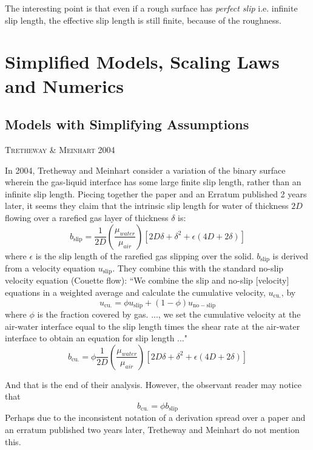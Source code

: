 \documentclass[12pt, a4paper, twoside, openright]{book}
\newcommand{\paper}[1]
         {\colorbox[gray]{0.8}{ \textsc{#1}}
         
         }
\begin{document}
The interesting point is that even if a rough surface has \emph{perfect slip} i.e. infinite slip length, the effective slip length is still finite, because of the roughness.


\section*{Simplified Models, Scaling Laws and Numerics}

\subsection*{Models with Simplifying Assumptions}

\paper{Tretheway \& Meinhart 2004}
In 2004, Tretheway and Meinhart \cite{TrethewayMeinhart2004} consider a variation of the binary surface wherein the gas-liquid interface has some large finite slip length, rather than an infinite slip length.  Piecing together the paper and an Erratum \cite{TrethewayMeinhartErratum2004} published 2 years later, it seems they claim that the intrinsic slip length for water of thickness $2D$ flowing over a rarefied gas layer of thickness $\delta$ is:
\begin{equation}
b_{\mathrm{slip}} = \frac{1}{2D} \left( \frac{\mu_{water}}{\mu_{air}} \right)
\left[ 2D\delta + \delta^2 + \epsilon(4D + 2\delta) \right]
\end{equation}
where $\epsilon$ is the slip length of the rarefied gas slipping over the solid.  $b_{\mathrm{slip}}$ is derived from a velocity equation $u_{\mathrm{slip}}$.  They combine this with the standard no-slip velocity equation (Couette flow):
``We combine the slip and no-slip [velocity] equations in a weighted average and calculate the cumulative velocity, $u_{\mathrm{cu.}}$, by
\begin{equation}
u_{\mathrm{cu.}} = \phi u_{\mathrm{slip}} + (1-\phi) u_{\mathrm{no-slip}}
\end{equation}
where $\phi$ is the fraction covered by gas. ..., we set the cumulative velocity at the air-water interface equal to the slip length times the shear rate at the air-water interface to obtain an equation for slip length ..."
\begin{equation}
b_{\mathrm{cu.}} = \phi \frac{1}{2D} \left( \frac{\mu_{water}}{\mu_{air}} \right)
 \left[ 2D\delta + \delta^2 + \epsilon(4D + 2\delta) \right]
\end{equation}

And that is the end of their analysis.  However, the observant reader may notice that
\begin{equation}
b_{\mathrm{cu.}} = \phi b_{\mathrm{slip}} 
\end{equation}
Perhaps due to the inconsistent notation of a derivation spread over a paper and an erratum published two years later, Tretheway and Meinhart do not mention this.
\end{document}

